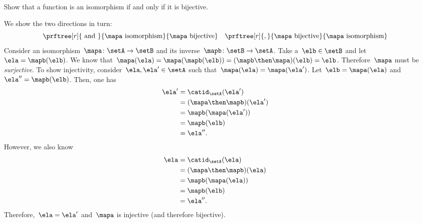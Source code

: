 \begin{exercise}
    \label{ex:bijective-functions-are-isomorphisms}
    Show that a function is an isomorphism if and only if it is bijective.
\end{exercise}
\begin{solution}
    We show the two directions in turn:
    \begin{equation*}
    \prftree[r]{\text{ and }}{\mapa \text{ isomorphism}}{\mapa \text{ bijective}} \quad \prftree[r]{,}{\mapa \text{ bijective}}{\mapa \text{ isomorphism}}
    \end{equation*}
    Consider an isomorphism~$\mapa\colon \setA \to \setB$ and its inverse~$\mapb\colon \setB\to \setA$.
    Take a~$\elb\in \setB$ and let~$\ela= \mapb(\elb)$.
    We know that~$\mapa(\ela)=\mapa(\mapb(\elb))=(\mapb\then \mapa)(\elb)=\elb$.
    Therefore~$\mapa$ must be \emph{surjective}.
    To show injectivity, consider~$\ela,\ela'\in \setA$ such that~$\mapa(\ela)=\mapa(\ela')$.
    Let~$\elb=\mapa(\ela)$ and~$\ela''=\mapb(\elb)$.
    Then, one has
    \begin{equation*}
        \begin{aligned}
            \ela'&=\catid_\setA(\ela')\\
            &=(\mapa \then \mapb)(\ela')\\
            &=\mapb(\mapa(\ela'))\\
            &=\mapb(\elb)\\
            &=\ela''.
        \end{aligned}
    \end{equation*}
    However, we also know
    \begin{equation*}
        \begin{aligned}
            \ela&=\catid_\setA(\ela)\\
            &=(\mapa \then \mapb)(\ela)\\
            &=\mapb(\mapa(\ela))\\
            &=\mapb(\elb)\\
            &=\ela''.
        \end{aligned}
    \end{equation*}
    Therefore,~$\ela=\ela'$ and~$\mapa$ is injective (and therefore bijective).


\end{solution}
